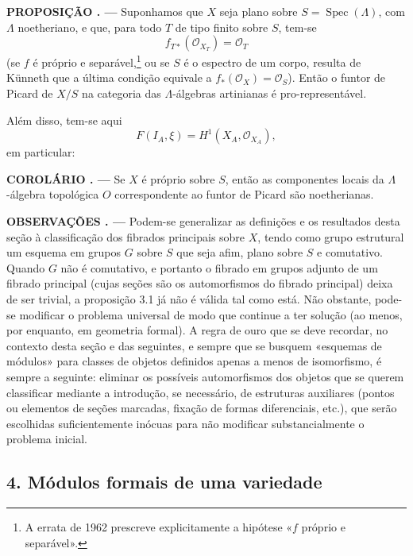 \documentclass[11pt,twoside,openany]{book}
\numberwithin{equation}{section}
\newcommand{\src}[1]{%
  \phantomsection\hypertarget{src:#1}{}%
  \marginpar{\raggedleft\footnotesize\sffamily #1}%
}
\theoremstyle{plain}
\theoremstyle{definition}
\theoremstyle{remark}
\newcommand{\result}[2]{%
  \par\medskip\noindent\textbf{#1%
  \if\relax\detokenize{#2}\relax\else\space#2\fi. ---}\enspace
}
\newcommand{\FgaUnitKey}{frontmatter}
\renewcommand{\src}[1]{%
  \phantomsection\hypertarget{src:\FgaUnitKey:#1}{}%
  \marginpar{\raggedleft\footnotesize\sffamily #1}%
}
\begin{document}
\src{384}
\result{PROPOSIÇÃO}{3.1} Suponhamos que $X$ seja plano sobre
$S=\operatorname{Spec}(\Lambda)$, com $\Lambda$ noetheriano, e que, para todo
$T$ de tipo finito sobre $S$, tem-se
\[
  f_{T*}(\mathcal O_{X_T})=\mathcal O_T
\]
(se $f$ é próprio e separável,\footnote{A errata de 1962 prescreve
explicitamente a hipótese «$f$ próprio e separável».} ou se $S$ é o espectro
de um corpo, resulta de Künneth que a última condição equivale a
$f_*(\mathcal O_X)=\mathcal O_S$). Então o funtor de Picard de $X/S$ na
categoria das $\Lambda$-álgebras artinianas é pro-representável.

Além disso, tem-se aqui
\[
  F(I_A,\xi)=H^1(X_A,\mathcal O_{X_A}),
\]
em particular:

\result{COROLÁRIO}{} Se $X$ é próprio sobre $S$, então as componentes
locais da $\Lambda$-álgebra topológica $O$ correspondente ao funtor de
Picard são noetherianas.

\result{OBSERVAÇÕES}{} Podem-se generalizar as definições e os resultados
desta seção à classificação dos fibrados principais sobre $X$, tendo como
grupo estrutural um esquema em grupos $G$ sobre $S$ que seja afim, plano sobre
$S$ e comutativo. Quando $G$ não é comutativo, e portanto o fibrado em
grupos adjunto de um fibrado principal (cujas seções são os automorfismos
do fibrado principal) deixa de ser trivial, a proposição 3.1 já não é válida
tal como está. Não obstante, pode-se modificar o problema universal de modo que
continue a ter solução (ao menos, por enquanto, em geometria formal). A regra de
ouro que se deve recordar, no contexto desta \src{385}seção e das
seguintes, e sempre que se busquem «esquemas de módulos» para classes de
objetos definidos apenas a menos de isomorfismo, é sempre a seguinte: eliminar
os possíveis automorfismos dos objetos que se querem classificar mediante
a introdução, se necessário, de estruturas auxiliares (pontos ou
elementos de seções marcadas, fixação de formas diferenciais, etc.), que
serão escolhidas suficientemente inócuas para não modificar substancialmente o
problema inicial.

\subsection*{4. Módulos formais de uma variedade}
\end{document}
